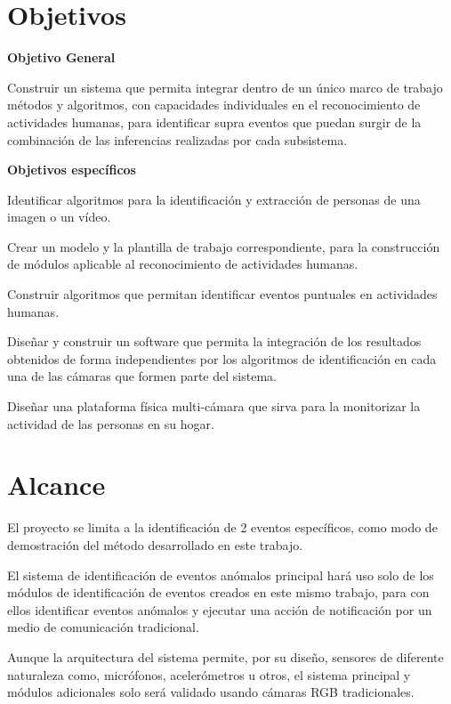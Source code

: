 \section{Objetivos}
\label{Objectives}

    \vspace{1cm}
    \textbf{Objetivo General}
    
        Construir un sistema que permita integrar dentro de un único marco de trabajo métodos y algoritmos, con capacidades individuales en el reconocimiento de actividades humanas, para identificar supra eventos que puedan surgir de la combinación de las inferencias realizadas por cada subsistema.
        
    \vspace{2cm}
        
    \textbf{Objetivos específicos}

    Identificar algoritmos para la identificación y extracción de personas de una imagen o un vídeo.
    
    Crear un modelo y la plantilla de trabajo correspondiente, para la construcción de módulos aplicable al reconocimiento de actividades humanas.
    
    Construir algoritmos que permitan identificar eventos puntuales en actividades humanas.
    
    Diseñar y construir un software que permita la integración de los resultados obtenidos de forma independientes por los algoritmos de identificación en cada una de las cámaras que formen parte del sistema.
    
    Diseñar una plataforma física multi-cámara que sirva para la monitorizar la actividad de las personas en su hogar.

\newpage
\section{Alcance}
\label{Scope}
    El proyecto se limita a la identificación de 2 eventos específicos, como modo de demostración del método desarrollado en este trabajo.
    
    El sistema de identificación de eventos anómalos principal hará uso solo de los módulos de identificación de eventos creados en este mismo trabajo, para con ellos identificar eventos anómalos y ejecutar una acción de notificación por un medio de comunicación tradicional.
    
    Aunque la arquitectura del sistema permite, por su diseño, sensores de diferente naturaleza como, micrófonos, acelerómetros u otros, el sistema principal y módulos adicionales solo será validado usando cámaras RGB tradicionales.
    